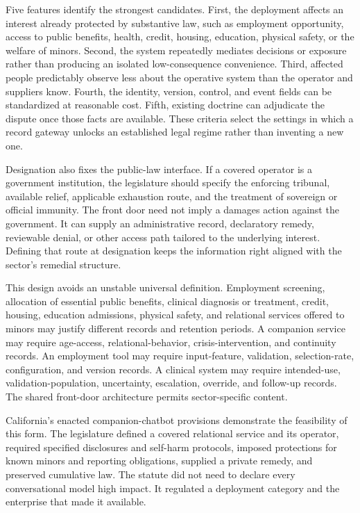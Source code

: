 Five features identify the strongest candidates. First, the deployment affects an interest already protected by substantive law, such as employment opportunity, access to public benefits, health, credit, housing, education, physical safety, or the welfare of minors. Second, the system repeatedly mediates decisions or exposure rather than producing an isolated low-consequence convenience. Third, affected people predictably observe less about the operative system than the operator and suppliers know. Fourth, the identity, version, control, and event fields can be standardized at reasonable cost. Fifth, existing doctrine can adjudicate the dispute once those facts are available. These criteria select the settings in which a record gateway unlocks an established legal regime rather than inventing a new one.

Designation also fixes the public-law interface. If a covered operator is a government institution, the legislature should specify the enforcing tribunal, available relief, applicable exhaustion route, and the treatment of sovereign or official immunity. The front door need not imply a damages action against the government. It can supply an administrative record, declaratory remedy, reviewable denial, or other access path tailored to the underlying interest. Defining that route at designation keeps the information right aligned with the sector's remedial structure.

This design avoids an unstable universal definition. Employment screening, allocation of essential public benefits, clinical diagnosis or treatment, credit, housing, education admissions, physical safety, and relational services offered to minors may justify different records and retention periods. A companion service may require age-access, relational-behavior, crisis-intervention, and continuity records. An employment tool may require input-feature, validation, selection-rate, configuration, and version records. A clinical system may require intended-use, validation-population, uncertainty, escalation, override, and follow-up records. The shared front-door architecture permits sector-specific content.

California's enacted companion-chatbot provisions demonstrate the feasibility of this form. The legislature defined a covered relational service and its operator, required specified disclosures and self-harm protocols, imposed protections for known minors and reporting obligations, supplied a private remedy, and preserved cumulative law. The statute did not need to declare every conversational model high impact. It regulated a deployment category and the enterprise that made it available.

